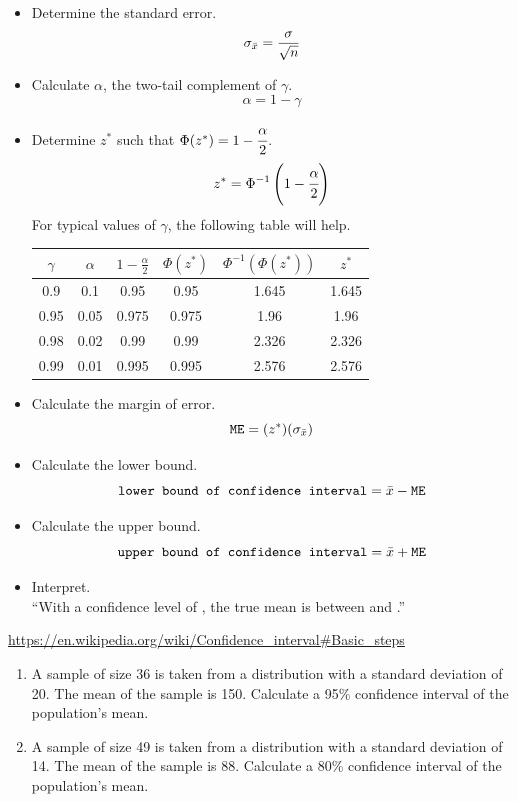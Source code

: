 \documentclass[12pt,letterpaper]{article}
\begin{document}
\begin{itemize}
\item Determine the standard error.
$$\sigma_{\bar{x}} = \frac{\sigma}{\sqrt{n}} $$
\item Calculate $\alpha$, the two-tail complement of $\gamma$.
$$\alpha = 1-\gamma $$

\item Determine $z^*$ such that $\Phi(z^*) = 1-\cfrac{\alpha}{2}$.
$$z^* = \Phi^{-1}\left(1-\cfrac{\alpha}{2}\right) $$
For typical values of $\gamma$, the following table will help.
\begin{center}
\begin{tabular}{|c|c|c|c|c|c|}\hline
$\gamma$ & $\alpha$ & $1-\frac{\alpha}{2}$ & $\Phi(z^*)$ & $\Phi^{-1}(\Phi(z^*))$ & $z^*$ \\ \hline
0.9 & 0.1 & 0.95 & 0.95 & 1.645 & 1.645 \\
0.95 & 0.05 & 0.975 & 0.975 & 1.96 & 1.96 \\
0.98 & 0.02 & 0.99 & 0.99 & 2.326 & 2.326\\
0.99 & 0.01 & 0.995 & 0.995 & 2.576 & 2.576\\ \hline
\end{tabular}
\end{center}

\item Calculate the margin of error.
$$\mathtt{ME} = (z^*)(\sigma_{\bar{x}}) $$

\item Calculate the lower bound.
$$\texttt{lower bound of confidence interval} = \bar{x}-\mathtt{ME} $$
\item Calculate the upper bound.
$$\texttt{upper bound of confidence interval} = \bar{x}+\mathtt{ME} $$
\item Interpret.\\
``With a confidence level of \fbox{\phantom{H} $\gamma$ \phantom{H}}, the true mean is between  and .''
\end{itemize}
\url{https://en.wikipedia.org/wiki/Confidence_interval#Basic_steps}
\newpage
\begin{enumerate}[resume]
\item A sample of size 36 is taken from a distribution with a standard deviation of 20. The mean of the sample is 150. Calculate a 95\% confidence interval of the population's mean.
\vfill
\item A sample of size 49 is taken from a distribution with a standard deviation of 14. The mean of the sample is 88. Calculate a 80\% confidence interval of the population's mean.
\vfill

\end{enumerate}
\end{document}
